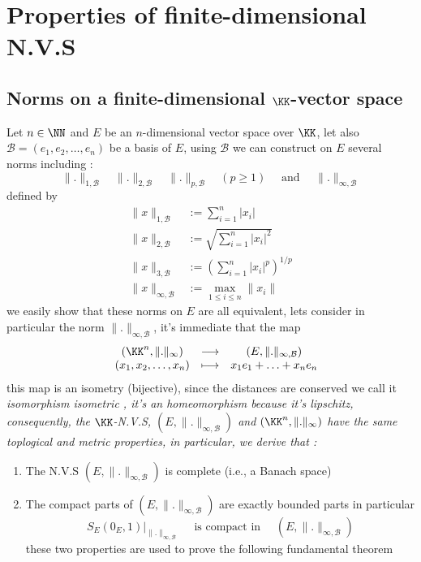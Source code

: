 \chapter{Properties of finite-dimensional N.V.S}
\section{Norms on a finite-dimensional \texorpdfstring{$\KK$}{K}-vector space}
Let $n \in \NN$ and $E$ be an $n$-dimensional vector space over $\KK$, 
let also $\mathcal{B} = \left( e_1,e_2, \hdots , e_{n} \right)$ 
be a basis of $E$, using $\mathcal{B} $ we can construct on $E$ several norms including :
\[
\| . \| _{1,\mathcal{B} } \quad 
\| . \| _{2, \mathcal{B} } \quad 
\| . \| _{p, \mathcal{B} } \quad 
\left( p \geq 1 \right) \quad \text{ and }  \quad 
\| . \|  _{\infty ,\mathcal{B} }
\]
defined by 
\begin{align*}
	\| x \| _{1,\mathcal{B} } &:= 
\sum_{i=1}^{n} \left| x_{i} \right| \\
	\| x \| _{2,\mathcal{B} } &:=
\sqrt{\sum_{i=1}^{n} \left| x_{i} \right|^2 }  \\
	\| x \| _{3,\mathcal{B} } &:= 
	\left( 
		\sum_{i=1}^{n} 
		\left| x_{i} \right|^{p}
	\right)^{1/p} \\
	\| x \| _{\infty ,\mathcal{B} } &:= 
	\max _{1 \leq i \leq n} \| x_{i} \| 
\end{align*}
we easily show that these norms on $E$ are all equivalent, lets consider in particular 
the norm $\| . \| _{\infty , \mathcal{B} }$, it's immediate that the map 
\[
\begin{array}{cccc}
        &  \left( \KK^n , \| . \| _{\infty } \right)  & \longrightarrow & \left( 
	       E, \| . \| _{\infty , \mathcal{B} }
       \right) \\

           &   (x_1,x_2, \hdots ,x_{n}) & \longmapsto     &  x_1 e_1 + \hdots + x_{n}e_{n}\\ 
\end{array}
\]
this map is an isometry (bijective), since the distances are conserved 
we call it \it isomorphism isometric \normalfont, it's an homeomorphism
because it's lipschitz, consequently, the $\KK$-N.V.S, 
$\left( E, \| . \| _{\infty , \mathcal{B} } \right)$  and 
$\left( \KK^n  , \| . \| _{\infty }\right)$  have the same toplogical and 
metric properties, in particular, we derive that : 
\begin{enumerate}[(1)]
	\item The N.V.S $\left( E, \| . \|_{\infty , \mathcal{B} }  \right)$  
		is complete (i.e., a Banach space)  
	\item The compact parts of $\left( E, \| . \| _{\infty , \mathcal{B} } \right)$   
		are exactly bounded parts in particular 
		\[
		S_{E} \left( 0_{E},1 \right)|_{ \| . \| _{\infty ,\mathcal{B} }}
	\quad \text{ is compact in } \quad 
	\left( E, \| . \| _{\infty ,\mathcal{B} } \right)
		\]
		these two properties are used to prove the following fundamental
		theorem
\end{enumerate}
